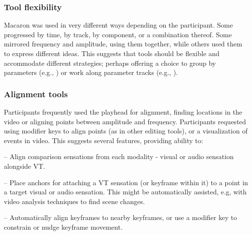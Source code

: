     \subsubsection{Tool flexibility}
    Macaron was used in very different ways depending on the participant.
    Some progressed by time, by track, by component, or a combination thereof.
    Some mirrored  frequency and amplitude, using them together, while others used them to express different ideas. %
    This suggests that tools should be flexible and accommodate different strategies; perhaps offering a choice to group by parameters (e.g., \cite{Schneider2015}) or work along parameter tracks (e.g., \cite{Swindells2014,Swindells2006}).
    
    \subsubsection{Alignment tools}
    Participants frequently used the playhead for alignment, finding locations in the video or aligning points between amplitude and frequency.
    Participants requested using modifier keys to align points (as in other editing tools), or a visualization of events in video.
    This suggests several features, providing ability to:
        \par -- Align comparison sensations from each modality - visual or audio sensation alongside VT. %
        \par -- Place anchors for attaching a VT sensation (or keyframe within it) to a point in a target visual or audio sensation. This might be automatically assisted, e.g, with video analysis techniques to find scene changes.
        \par -- Automatically align keyframes to nearby keyframes, or use a modifier key to constrain or nudge keyframe movement.
    
